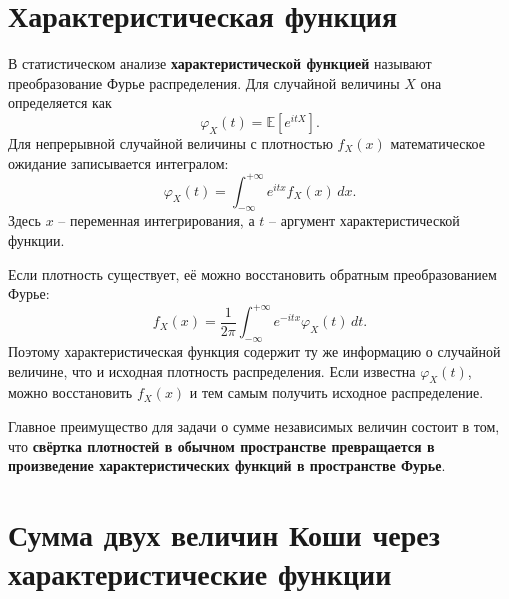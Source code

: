 \documentclass[
  russian,
  12pt,
  a4paper,
  a4paper,
  openany]{scrbook}
\begin{document}
\section{Характеристическая
функция}\label{ux445ux430ux440ux430ux43aux442ux435ux440ux438ux441ux442ux438ux447ux435ux441ux43aux430ux44f-ux444ux443ux43dux43aux446ux438ux44f}

\begin{booknote}

В статистическом анализе \textbf{характеристической функцией} называют
преобразование Фурье распределения. Для случайной величины \(X\) она
определяется как \[\boxed{
\varphi_X(t)
=
\mathbb{E}\!\left[e^{itX}\right].
}\] Для непрерывной случайной величины с плотностью \(f_X(x)\)
математическое ожидание записывается интегралом: \[\boxed{
\varphi_X(t)
=
\int_{-\infty}^{+\infty}
e^{itx}f_X(x)\,dx.
}\] Здесь \(x\) -- переменная интегрирования, а \(t\) -- аргумент
характеристической функции.

\end{booknote}

Если плотность существует, её можно восстановить обратным
преобразованием Фурье: \[\boxed{
f_X(x)
=
\frac{1}{2\pi}
\int_{-\infty}^{+\infty}
e^{-itx}\varphi_X(t)\,dt.
}\] Поэтому характеристическая функция содержит ту же информацию о
случайной величине, что и исходная плотность распределения. Если
известна \(\varphi_X(t)\), можно восстановить \(f_X(x)\) и тем самым
получить исходное распределение.

Главное преимущество для задачи о сумме независимых величин состоит в
том, что \textbf{свёртка плотностей в обычном пространстве превращается
в произведение характеристических функций в пространстве Фурье}.

\section{Сумма двух величин Коши через характеристические
функции}\label{ux441ux443ux43cux43cux430-ux434ux432ux443ux445-ux432ux435ux43bux438ux447ux438ux43d-ux43aux43eux448ux438-ux447ux435ux440ux435ux437-ux445ux430ux440ux430ux43aux442ux435ux440ux438ux441ux442ux438ux447ux435ux441ux43aux438ux435-ux444ux443ux43dux43aux446ux438ux438}
\end{document}
